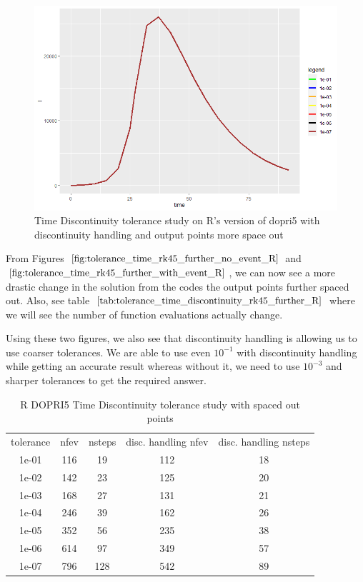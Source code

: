 \begin{figure}[h]
	\centering
	\includegraphics[width=0.7\linewidth]{./figures/tolerance_time_rk45_further_with_event_R}
	\caption{Time Discontinuity tolerance study on R's version of dopri5 with discontinuity handling and output points more space out}
	\label{fig:tolerance_time_rk45_further_with_event_R}
\end{figure}

From Figures $\ref{fig:tolerance_time_rk45_further_no_event_R}$ and $\ref{fig:tolerance_time_rk45_further_with_event_R}$, we can now see a more drastic change in the solution from the codes the output points further spaced out. Also, see table $\ref{tab:tolerance_time_discontinuity_rk45_further_R}$ where we will see the number of function evaluations actually change.

Using these two figures, we also see that discontinuity handling is allowing us to use coarser tolerances. We are able to use even $10^{-1}$ with discontinuity handling while getting an accurate result whereas without it, we need to use $10^{-3}$ and sharper tolerances to get the required answer.

\begin{table}[h]
\caption {R DOPRI5 Time Discontinuity tolerance study with spaced out points} \label{tab:tolerance_time_discontinuity_rk45_further_R} 
\begin{center}
\begin{tabular}{ c c c c c }
tolerance & nfev & nsteps & disc. handling nfev & disc. handling nsteps \\ 
1e-01 & 116 &  19 & 112 & 18 \\
1e-02 & 142 &  23 & 125 & 20 \\
1e-03 & 168 &  27 & 131 & 21 \\
1e-04 & 246 &  39 & 162 & 26 \\
1e-05 & 352 &  56 & 235 & 38 \\
1e-06 & 614 &  97 & 349 & 57 \\
1e-07 & 796 & 128 & 542 & 89 \\
\end{tabular}
\end{center}
\end{table}

